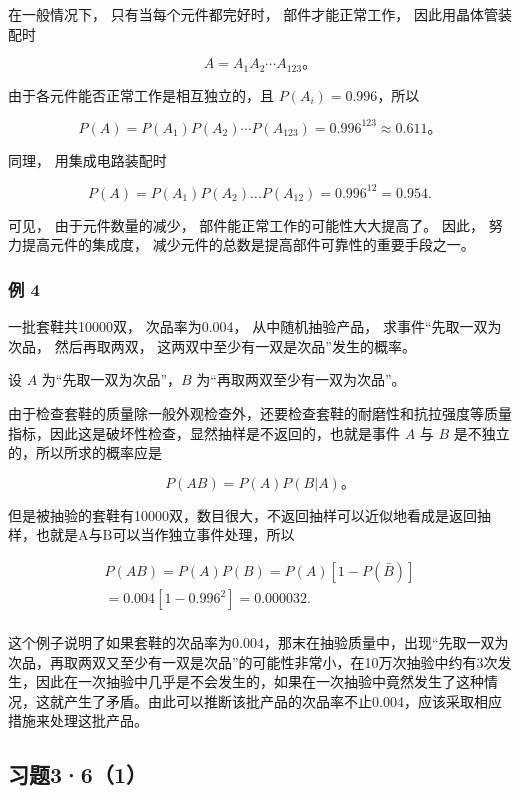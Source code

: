 在一般情况下， 只有当每个元件都完好时， 部件才能正常工作，
因此用晶体管装配时

\[
A=A_1A_2\cdots A_{123}\text{。}
\]

由于各元件能否正常工作是相互独立的，且 \(P(A_{i}) = 0.996\)，所以

\[
P(A)=P(A_1)P(A_2)\cdots P(A_{123})=0.996^{123}\approx0.611\text{。}
\]

同理， 用集成电路装配时

\[
P (A) = P (A _ {1}) P (A _ {2}) \dots P (A _ {12}) = 0.996 ^ {12} = 0.954.
\]

可见， 由于元件数量的减少， 部件能正常工作的可能性大大提高了。 因此，
努力提高元件的集成度， 减少元件的总数是提高部件可靠性的重要手段之一。

\subsubsection{例 4}

一批套鞋共10000双， 次品率为0.004， 从中随机抽验产品，
求事件``先取一双为次品， 然后再取两双，
这两双中至少有一双是次品''发生的概率。

 设 \(A\) 为``先取一双为次品''，\(B\)
为``再取两双至少有一双为次品''。

由于检查套鞋的质量除一般外观检查外，还要检查套鞋的耐磨性和抗拉强度等质量指标，因此这是破坏性检查，显然抽样是不返回的，也就是事件
\(A\) 与 \(B\) 是不独立的，所以所求的概率应是

\[
P (A B) = P (A) P (B | A)\text{。}
\]

但是被抽验的套鞋有10000双，数目很大，不返回抽样可以近似地看成是返回抽样，也就是A与B可以当作独立事件处理，所以

\[
\begin{array}{l} P (A B) = P (A) P (B) = P (A) [ 1 - P (\bar {B}) ] \\ = 0.004 [ 1 - 0.996 ^ {2} ] = 0.000032. \\ \end{array}
\]

这个例子说明了如果套鞋的次品率为0.004，那末在抽验质量中，出现``先取一双为次品，再取两双又至少有一双是次品''的可能性非常小，在10万次抽验中约有3次发生，因此在一次抽验中几乎是不会发生的，如果在一次抽验中竟然发生了这种情况，这就产生了矛盾。由此可以推断该批产品的次品率不止0.004，应该采取相应措施来处理这批产品。

\subsection{习题3·6（1）}

